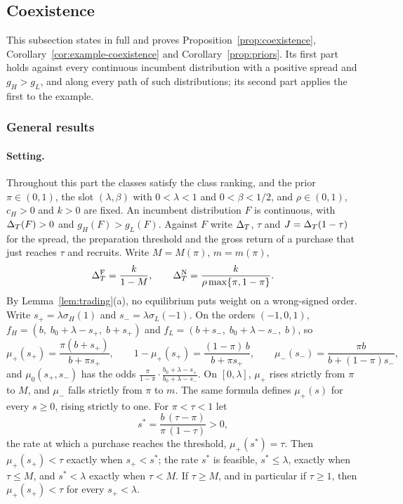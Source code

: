\subsection{Coexistence}\label{app:coexistence}

This subsection states in full and proves Proposition~\ref{prop:coexistence}, Corollary~\ref{cor:example-coexistence}
and Corollary~\ref{prop:priors}. Its first part holds against every continuous incumbent distribution with a positive
spread and \(g_H>g_L\), and along every path of such distributions; its second part applies the first to the example.

\subsubsection*{General results}

\paragraph{Setting.}
Throughout this part the classes satisfy the class ranking, and the prior \(\pi\in(0,1)\), the slot
\((\lambda,\beta)\) with \(0<\lambda<1\) and \(0<\beta<1/2\), and \(\rho\in(0,1)\), \(c_H>0\) and \(k>0\) are fixed. An
incumbent distribution \(F\) is continuous, with \(\Delta_T(F)>0\) and \(g_H(F)>g_L(F)\). Against \(F\) write \(\Delta_T\), \(\tau\) and
\(J=\Delta_T(1-\tau)\) for the spread, the preparation threshold and the gross return of a purchase that just reaches
\(\tau\) and recruits. Write \(M=M(\pi)\), \(m=m(\pi)\),
\[
\Delta_T^{\rm F}=\frac{k}{1-M},\qquad \Delta_T^{\rm N}=\frac{k}{\rho\max\{\pi,1-\pi\}} .
\]
By Lemma~\ref{lem:trading}(a), no equilibrium puts weight on a wrong-signed order. Write \(s_+=\lambda\sigma_H(1)\) and
\(s_-=\lambda\sigma_L(-1)\). On the orders \((-1,0,1)\), \(f_H=(b,\;b_0+\lambda-s_+,\;b+s_+)\) and
\(f_L=(b+s_-,\;b_0+\lambda-s_-,\;b)\), so
\[
\mu_+(s_+)=\frac{\pi(b+s_+)}{b+\pi s_+},\qquad 1-\mu_+(s_+)=\frac{(1-\pi)\,b}{b+\pi s_+},\qquad
\mu_-(s_-)=\frac{\pi b}{b+(1-\pi)s_-},
\]
and \(\mu_0(s_+,s_-)\) has the odds \(\frac{\pi}{1-\pi}\cdot\frac{b_0+\lambda-s_+}{b_0+\lambda-s_-}\). On \([0,\lambda]\),
\(\mu_+\) rises strictly from \(\pi\) to \(M\), and \(\mu_-\) falls strictly from \(\pi\) to \(m\). The same formula
defines \(\mu_+(s)\) for every \(s\ge0\), rising strictly to one. For \(\pi<\tau<1\) let
\[
s^*=\frac{b\,(\tau-\pi)}{\pi\,(1-\tau)}>0 ,
\]
the rate at which a purchase reaches the threshold, \(\mu_+(s^*)=\tau\). Then \(\mu_+(s_+)<\tau\) exactly when
\(s_+<s^*\); the rate \(s^*\) is feasible, \(s^*\le\lambda\), exactly when \(\tau\le M\), and \(s^*<\lambda\) exactly when
\(\tau<M\). If \(\tau\ge M\), and in particular if \(\tau\ge1\), then \(\mu_+(s_+)<\tau\) for every \(s_+<\lambda\).

